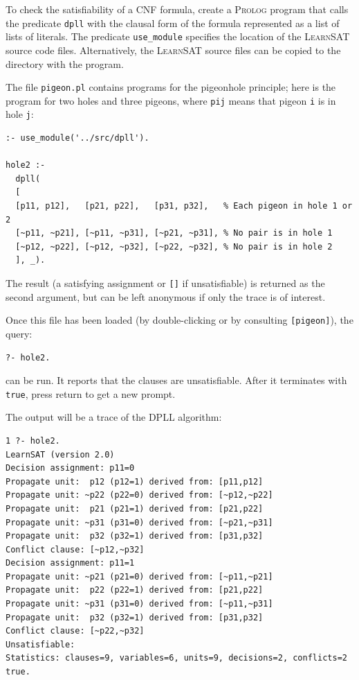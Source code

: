 \documentclass[11pt]{article}
\newcommand*{\p}[1]{\textup{\texttt{#1}}}
\newcommand*{\ls}{\textsc{LearnSAT}}
\newcommand*{\pl}{\textsc{Prolog}}
\begin{document}
To check the satisfiability of a CNF formula, create a \pl{} program
that calls the predicate \p{dpll} with the clausal form of the formula
represented as a list of lists of literals. The predicate \p{use\_module} specifies the location of the \ls{} source code files. Alternatively, the \ls{} source files can be copied to the directory with the program.

The file \p{pigeon.pl} contains programs for the pigeonhole principle; here is the program for two holes and three pigeons, where \p{pij} means that pigeon \p{i} is in hole \p{j}:

\begin{verbatim}
:- use_module('../src/dpll').

hole2 :-
  dpll(
  [
  [p11, p12],   [p21, p22],   [p31, p32],   % Each pigeon in hole 1 or 2 
  [~p11, ~p21], [~p11, ~p31], [~p21, ~p31], % No pair is in hole 1
  [~p12, ~p22], [~p12, ~p32], [~p22, ~p32], % No pair is in hole 2
  ], _).
\end{verbatim}

The result (a satisfying assignment or \p{[]} if unsatisfiable) is
returned as the second argument, but can be left anonymous if only
the trace is of interest.

Once this file has been loaded (by double-clicking or by consulting
\p{[pigeon]}), the query:
\begin{verbatim}
?- hole2. 
\end{verbatim}
can be run. It reports that the clauses are unsatisfiable. After it terminates with \p{true}, press return to get a new prompt.

The output will be a trace of the DPLL algorithm:

\begin{verbatim}
1 ?- hole2.
LearnSAT (version 2.0)
Decision assignment: p11=0
Propagate unit:  p12 (p12=1) derived from: [p11,p12]
Propagate unit: ~p22 (p22=0) derived from: [~p12,~p22]
Propagate unit:  p21 (p21=1) derived from: [p21,p22]
Propagate unit: ~p31 (p31=0) derived from: [~p21,~p31]
Propagate unit:  p32 (p32=1) derived from: [p31,p32]
Conflict clause: [~p12,~p32]
Decision assignment: p11=1
Propagate unit: ~p21 (p21=0) derived from: [~p11,~p21]
Propagate unit:  p22 (p22=1) derived from: [p21,p22]
Propagate unit: ~p31 (p31=0) derived from: [~p11,~p31]
Propagate unit:  p32 (p32=1) derived from: [p31,p32]
Conflict clause: [~p22,~p32]
Unsatisfiable:
Statistics: clauses=9, variables=6, units=9, decisions=2, conflicts=2
true.
\end{verbatim}
\end{document}
